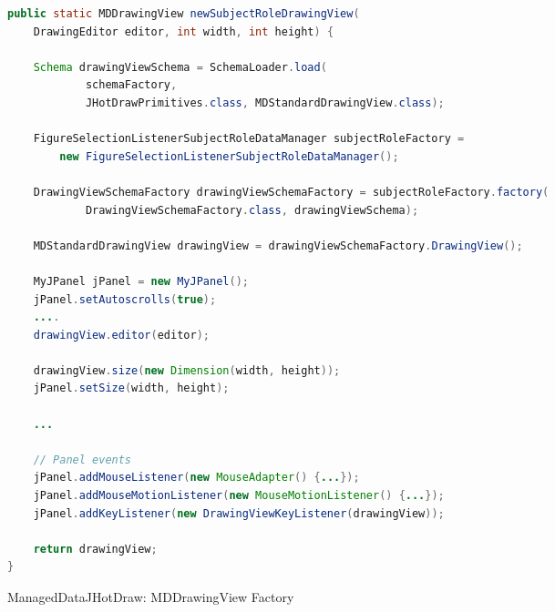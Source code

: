 \begin{sourcecode} [H]
	\begin{lstlisting}[language=Java]
public static MDDrawingView newSubjectRoleDrawingView(
	DrawingEditor editor, int width, int height) {

	Schema drawingViewSchema = SchemaLoader.load(
			schemaFactory,
			JHotDrawPrimitives.class, MDStandardDrawingView.class);

	FigureSelectionListenerSubjectRoleDataManager subjectRoleFactory =
		new FigureSelectionListenerSubjectRoleDataManager();

	DrawingViewSchemaFactory drawingViewSchemaFactory = subjectRoleFactory.factory(
			DrawingViewSchemaFactory.class, drawingViewSchema);

	MDStandardDrawingView drawingView = drawingViewSchemaFactory.DrawingView();

	MyJPanel jPanel = new MyJPanel();
	jPanel.setAutoscrolls(true);
	....
	drawingView.editor(editor);

	drawingView.size(new Dimension(width, height));
	jPanel.setSize(width, height);

	...

	// Panel events
	jPanel.addMouseListener(new MouseAdapter() {...});
	jPanel.addMouseMotionListener(new MouseMotionListener() {...});
	jPanel.addKeyListener(new DrawingViewKeyListener(drawingView));

	return drawingView;
}
	\end{lstlisting}
	\caption{ManagedDataJHotDraw: MDDrawingView Factory}
	\label{lst:ManagedDataJHotDraw_MDDrawingView_Factory}
\end{sourcecode}